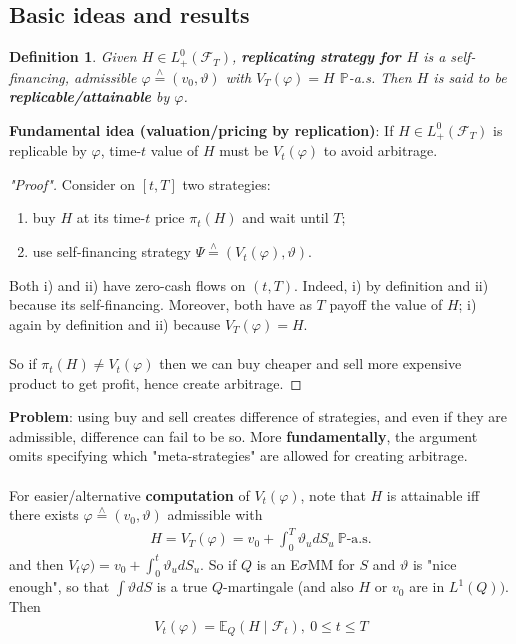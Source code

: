 \documentclass[12pt,a4paper, twoside]{article}
\newtheorem{defn}{Definition}[section]
\theoremstyle{definition}
\newcommand{\EE}{\mathbb{E}} %
\newcommand{\PP}{\mathbb{P}} %
\newcommand{\teq}{\overset{\wedge}{=}}
\begin{document}
\subsection{Basic ideas and results}
\begin{defn} Given $H \in L_+^0( \mathcal{F}_T)$, \textbf{replicating strategy for $H$} is a self-financing, admissible $\varphi \teq ( v_0, \vartheta)$ with $V_T( \varphi)=H$ $\PP$-a.s. Then $H$ is said to be \textbf{replicable/attainable} by $\varphi$.
\end{defn}
\noindent \textbf{Fundamental idea (valuation/pricing by replication)}: If $H \in L_+^0( \mathcal{F}_T)$ is replicable by $\varphi$, time-$t$ value of $H$ must be $V_t( \varphi)$ to avoid arbitrage.
\begin{proof}["Proof"] Consider on $[t,T]$ two strategies:
\begin{enumerate}
\item buy $H$ at its time-$t$ price $\pi_t(H)$ and wait until $T$; 
\item use self-financing strategy $\Psi \teq ( V_t( \varphi) , \vartheta)$. 
\end{enumerate}
Both i) and ii) have zero-cash flows on $(t,T)$. Indeed, i) by definition and ii) because its self-financing. Moreover, both have as $T$ payoff the value of $H$; i) again by definition and ii) because $V_T( \varphi)=H$. \\
\\
So if $\pi_t(H) \neq V_t( \varphi)$ then we can buy cheaper and sell more expensive product to get profit, hence create arbitrage. 
\end{proof}
\noindent \textbf{Problem}: using buy and sell creates difference of strategies, and even if they are admissible, difference can fail to be so. More \textbf{fundamentally}, the argument omits specifying which "meta-strategies" are allowed for creating arbitrage.\\
\\
For easier/alternative \textbf{computation} of $V_t( \varphi)$, note that $H$ is attainable iff there exists $\varphi \teq ( v_0, \vartheta)$ admissible with 
\begin{align*}
H= V_T( \varphi)= v_0 + \int_0^T \vartheta_u dS_u \ \PP\text{-a.s.}
\end{align*}
and then $V_t \varphi) = v_0 + \int_0^t \vartheta_u dS_u.$ So if $Q$ is an E$\sigma$MM for $S$ and $\vartheta$ is "nice enough", so that $\int \vartheta dS$ is a true $Q$-martingale (and also $H$ or $v_0$ are in $L^1(Q))$. Then 
\begin{align} \label{eq61}
V_t( \varphi)= \EE_Q( H \mid \mathcal{F}_t), \ 0 \leq t \leq T \tag{7.1}
\end{align}
\end{document}
